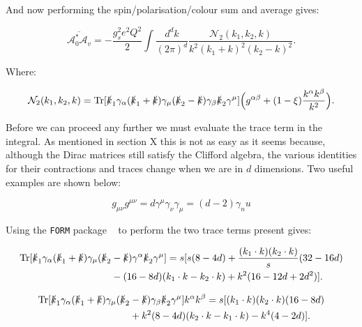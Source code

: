 	And now performing the spin/polarisation/colour sum and average gives:

	\begin{equation}
	\overline{\mathcal{A}_0^*\mathcal{A}_v} = -\frac{g_s^2e^2Q^2}{2}\int\frac{d^{d}k}
	{(2\pi)^{d}}\frac{\mathcal{N}_2(k_1, k_2,k)}{k^2(k_1+k)^2(k_2-k)^2}.
	\end{equation}

	Where:

	\begin{equation}
	\mathcal{N}_2(k_1, k_2, k) = \operatorname{Tr}[\slashed k_1 \gamma_\alpha(\slashed k_1 + \slashed k)\gamma_\mu
	(\slashed k_2 - \slashed k)\gamma_\beta\slashed k_2\gamma^\mu]\Big(g^{\alpha\beta} + (1-\xi)\frac{k^\alpha k^\beta}{k^2}\Big).
	\end{equation}

	Before we can proceed any further we must evaluate the trace term in the integral.  As mentioned in section X
	this is not as easy as it seems because, although the Dirac matrices still satisfy the Clifford algebra, the
	various identities for their contractions and traces change when we are in $d$ dimensions.  Two useful examples are shown below:

	\begin{subequations}
	\begin{equation}
	g_{\mu\nu}g^{\mu\nu} = d
	\end{equation}
	\begin{equation}
	\gamma^\mu\gamma_\nu\gamma_\mu = (d-2)\gamma_nu
	\end{equation}
	\end{subequations}

	Using the \texttt{FORM} package ~\cite{form} to perform the two trace terms present gives:

	\begin{equation}
	\begin{split}
	\operatorname{Tr}[\slashed k_1 \gamma_\alpha(\slashed k_1 + \slashed k)\gamma_\mu(\slashed k_2 &-
	\slashed k)\gamma^\alpha\slashed k_2\gamma^\mu] = s[s(8-4d) + \frac{(k_1\cdot k)(k_2\cdot k)}{s}(32-16d) \\
	&- (16-8d)(k_1\cdot k - k_2\cdot k) + k^2(16-12d+2d^2)].
	\end{split}
	\end{equation}

	\begin{equation}
	\begin{split}
	\operatorname{Tr}[\slashed k_1 \gamma_\alpha(\slashed k_1 + \slashed k)\gamma_\mu(\slashed k_2 &- \slashed k)\gamma_\beta
	\slashed k_2\gamma^\mu]k^\alpha k^\beta = s[(k_1\cdot k)(k_2\cdot k)(16 - 8d) \\
	&+ k^2(8 - 4d)(k_2\cdot k - k_1\cdot k) - k^4(4 - 2d)].
	\end{split}
	\end{equation}

